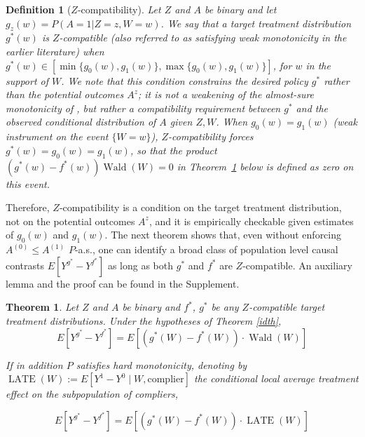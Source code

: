 \documentclass[12pt]{article}
\theoremstyle{thmstyleone}%
\newtheorem{theo}{Theorem}%
\theoremstyle{thmstyletwo}%
\theoremstyle{thmstylethree}%
\newtheorem{defi}{Definition}
\begin{document}
\begin{defi}[{$Z$-compatibility}]\label{def:weakmono}Let $Z$ and $A$ be binary and let $g_z(w) = P(A=1|Z=z,W=w)$.  {We say that a target treatment distribution $g^*(w)$ is \emph{$Z$-compatible} (also referred to as satisfying weak monotonicity in the earlier literature) when} $g^*(w) \in \left[ \min\{g_0(w), g_1(w)\}, \max\{g_0(w), g_1(w)\} \right]$, for $w$ in the support of $W$.  {We note that this condition constrains the desired policy $g^*$ rather than the potential outcomes $A^z$; it is not a weakening of the almost-sure monotonicity of \citet{imbens,angrist1996identification}, but rather a compatibility requirement between $g^*$ and the observed conditional distribution of $A$ given $Z,W$. When $g_0(w)=g_1(w)$ (weak instrument on the event $\{W=w\}$), $Z$-compatibility forces $g^*(w)=g_0(w)=g_1(w)$, so that the product $(g^*(w)-f^*(w))\operatorname{Wald}(W)=0$ in Theorem~\ref{generaldiff} below is defined as zero on this event.}

\end{defi}


 {Therefore, $Z$-compatibility is a condition on the target treatment distribution, not on the potential outcomes $A^z$, and it is empirically checkable given estimates of $g_0(w)$ and $g_1(w)$.} The next theorem shows that, even without enforcing $A^{(0)}\le A^{(1)}$ $P$-a.s., one can identify a broad class of population level causal contrasts $E[Y^{g^*}-Y^{f^*}]$ as long as both $g^*$ and $f^*$ are $Z$-compatible. An auxiliary lemma and the proof can be found in the Supplement. 









\begin{theo}\label{generaldiff}
Let $Z$ and $A$ be binary and $f^*$, $g^*$ be any  {$Z$-compatible} target treatment distributions. Under the hypotheses of Theorem \ref{idth},
$$E\left[Y^{g^*} - Y^{f^*} \right]  = E\left[ \left(g^*(W) - f^*(W)\right)\cdot \operatorname{Wald}(W) \right]$$

If in addition $P$ satisfies hard monotonicity,  {denoting by $\operatorname{LATE}(W) := E[Y^1 - Y^0 \mid W, \mathrm{complier}]$ the conditional local average treatment effect on the subpopulation of compliers,}

$$E\left[Y^{g^*} - Y^{f^*} \right]  = E\left[ \left(g^*(W) - f^*(W)\right)\cdot \operatorname{LATE}(W) \right]$$



\end{theo}
\end{document}

